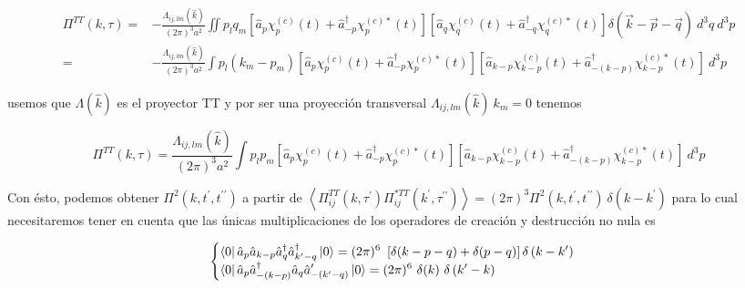 \begin{equation*}
    \begin{split}
        \Pi^{TT} (k,\tau) =& - \frac{\Lambda_{ij,lm} (\hat{k})}{(2 \pi)^3 a^2} \iint p_l q_m \left[ \hat{a}_p \chi^{(c)}_p (t) + \hat{a}^\dagger_{-p} \chi^{(c) *}_p (t) \right] \left[ \hat{a}_q \chi^{(c)}_q (t) + \hat{a}^\dagger_{-q} \chi^{(c) *}_q (t) \right] \delta \left( \vec{k} - \vec{p} - \vec{q} \right) ~ d^3 q ~ d^3 p\\
        =& - \frac{\Lambda_{ij,lm} (\hat{k})}{(2 \pi)^3 a^2} \int p_l (k_m - p_m) \left[ \hat{a}_p \chi^{(c)}_p (t) + \hat{a}^\dagger_{-p} \chi^{(c) *}_p (t) \right] \left[ \hat{a}_{k - p} \chi^{(c)}_{k - p} (t) + \hat{a}^\dagger_{-(k - p)} \chi^{(c) *}_{k - p} (t) \right] ~ d^3 p
    \end{split}
\end{equation*}

\noindent
usemos que $\Lambda(\hat{k})$ es el proyector TT y por ser una proyección transversal $\Lambda_{ij,lm} (\hat{k}) ~ k_m = 0$ tenemos

\begin{equation}
    \Pi^{TT} (k,\tau) = \frac{\Lambda_{ij,lm} (\hat{k})}{(2 \pi)^3 a^2} \int p_l p_m \left[ \hat{a}_p \chi^{(c)}_p (t) + \hat{a}^\dagger_{-p} \chi^{(c) *}_p (t) \right] \left[ \hat{a}_{k - p} \chi^{(c)}_{k - p} (t) + \hat{a}^\dagger_{-(k - p)} \chi^{(c) *}_{k - p} (t) \right] ~ d^3 p
\end{equation}

Con ésto, podemos obtener $\Pi^2 \left( k, t^\prime, t^{\prime \prime} \right)$ a partir de $\displaystyle \left\langle \Pi^{TT}_{ij} \left( k, \tau^{\prime} \right) \Pi^{*TT}_{ij} \left( k^\prime, \tau^{\prime \prime} \right) \right\rangle  = (2\pi)^3 \Pi^2 \left( k, t^\prime, t^{\prime \prime} \right) ~ \delta \left( k - k^\prime \right)$ para lo cual necesitaremos tener en cuenta que las únicas multiplicaciones de los operadores de creación y destrucción no nula es 

\begin{equation}
    \begin{cases}
        \displaystyle \bra{0} \hat{a}_p \hat{a}_{k - p} \hat{a}^\dagger_q \hat{a}^\dagger_{k^\prime - q} \ket{0} = (2\pi)^6 ~ \left[ \delta (k - p - q) + \delta (p - q) \right] \delta \left( k - k^\prime  \right)\\
        \displaystyle \bra{0} \hat{a}_p \hat{a}^\dagger_{-(k-p)} \hat{a}_q \hat{a}^{\prime}_{-\left( k^\prime - q \right)} \ket{0} = (2\pi)^6 ~ \delta (k) ~ \delta \left( k^\prime - k \right)
    \end{cases}
\end{equation}


